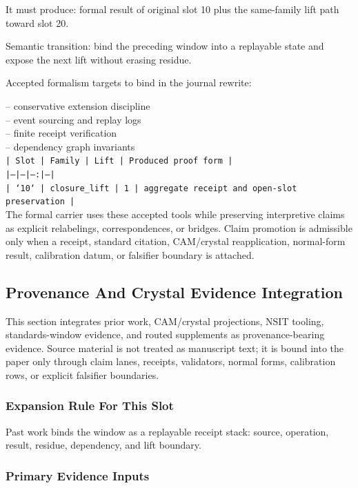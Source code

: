 \documentclass[11pt]{article}
\begin{document}
It must produce: formal result of original slot 10 plus the same-family lift path toward slot 20.

Semantic transition: bind the preceding window into a replayable state and expose the next lift without erasing residue.

Accepted formalism targets to bind in the journal rewrite:

\noindent{}-- conservative extension discipline\\
\noindent{}-- event sourcing and replay logs\\
\noindent{}-- finite receipt verification\\
\noindent{}-- dependency graph invariants\\

\noindent\texttt{| Slot | Family | Lift | Produced proof form |}\\
\noindent\texttt{|---|---|---:|---|}\\
\noindent\texttt{| `10` | closure\_lift | 1 | aggregate receipt and open-slot preservation |}\\

The formal carrier uses these accepted tools while preserving interpretive
claims as explicit relabelings, correspondences, or bridges. Claim promotion is admissible only when a receipt, standard citation,
CAM/crystal reapplication, normal-form result, calibration datum, or falsifier
boundary is attached.

\subsection*{Provenance And Crystal Evidence Integration}

This section integrates prior work, CAM/crystal projections, NSIT tooling,
standards-window evidence, and routed supplements as provenance-bearing
evidence. Source material is not treated as manuscript text; it is bound into
the paper only through claim lanes, receipts, validators, normal forms,
calibration rows, or explicit falsifier boundaries.

\subsubsection*{Expansion Rule For This Slot}

Past work binds the window as a replayable receipt stack: source, operation, result, residue, dependency, and lift boundary.

\subsubsection*{Primary Evidence Inputs}
\end{document}
